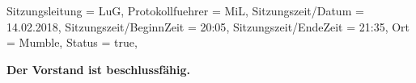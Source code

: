 



\begin{Protokoll}{
        Sitzungsleitung                 = {LuG},             %
        Protokollfuehrer                = {MiL},              %
        Sitzungszeit/Datum              = {14.02.2018},       %
        Sitzungszeit/BeginnZeit         = {20:05},            %
        Sitzungszeit/EndeZeit           = {21:35},            %
        Ort                             = {Mumble},            %
        Status                          = {true},            %
		    }
    
    
    \begin{Anwesenheitsliste}
    \end{Anwesenheitsliste}
    
    \textbf{Der Vorstand ist beschlussfähig.}

    


\end{Protokoll}
